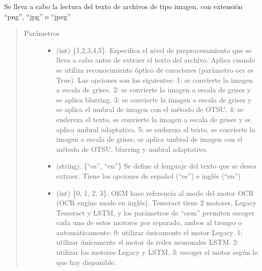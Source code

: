 \documentclass[letterpaper,10pt,openany,spanish]{sphinxmanual}
\begin{document}
\begin{fulllineitems}
\begin{fulllineitems}
\begin{quote}
\begin{description}
\end{description}\end{quote}

\end{fulllineitems}


\begin{fulllineitems}
\label{\detokenize{funciones/lectura:lectura.Lector.leer_imagen}}
Se lleva a cabo la lectura del texto de archivos de tipo imagen, con extensión “png”, “jpg” o “jpeg”
\begin{quote}\begin{description}
\item[{Parámetros}] \leavevmode\begin{itemize}
\item {} 
 \textendash{} (int) \{1,2,3,4,5\}. Especifica el nivel de preprocesamiento             que se lleva a cabo antes de extraer el texto del archivo. Aplica cuando se utiliza             reconocimiento óptico de caracteres (parámetro ocr es True). Las opciones son las siguientes:               
 1: se convierte la imagen a escala de grises.  
 2: se convierte la imagen a escala de grises y se aplica blurring.  
 3: se convierte la imagen a escala de grises y se aplica el umbral de imagen con el método de OTSU.  
 4: se endereza el texto, se convierte la imagen a escala de grises y se aplica umbral adaptativo.  
 5: se endereza el texto, se convierte la imagen a escala de grises, se aplica umbral de imagen con el método de OTSU, blurring y umbral adaptativo.  


\item {} 
 \textendash{} (string). \{“es”, “en”\}  Se define el lenguaje del texto que se desea extraer.             Tiene las opciones de español (“es”) e inglés (“en”)

\item {} 
 \textendash{} (int) \{0, 1, 2, 3\}. OEM hace referencia al modo del motor OCR (OCR engine mode             en inglés). Tesseract tiene 2 motores, Legacy Tesseract y LSTM, y los parámetros de “oem”             permiten escoger cada uno de estos motores por separado, ambos al tiempo o             automáticamente:               
 0: utilizar únicamente el motor Legacy.  
 1: utilizar únicamente el motor de redes neuronales LSTM.  
 2: utilizar los motores Legacy y LSTM.  
 3: escoger el motor según lo que hay disponible.  



\end{itemize}
\end{description}
\end{quote}
\end{fulllineitems}
\end{fulllineitems}
\end{document}
